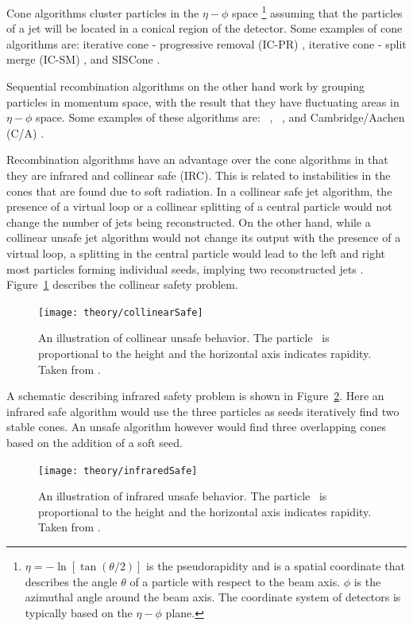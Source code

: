 Cone algorithms cluster particles in the $\eta-\phi$ space \footnote{$\eta = -\ln [\tan(\theta/2)]$ is the pseudorapidity and is a spatial coordinate that describes the angle $\theta$ of a particle with respect to the beam axis. $\phi$ is the azimuthal angle around the beam axis. The coordinate system of detectors is typically based on the $\eta-\phi$ plane.} assuming that the particles of a jet will be located in a conical region of the detector.
Some examples of cone algorithms are: iterative cone - progressive removal (IC-PR) \cite{ARNISON1983214}, iterative cone - split merge (IC-SM) \cite{Blazey:2000qt}, and SISCone \cite{Salam_2007}.

Sequential recombination algorithms on the other hand work by grouping particles in momentum space, with the result that they have fluctuating areas in $\eta-\phi$ space.
Some examples of these algorithms are: \kt\ \cite{Catani:1993hr}, \antikt\ \cite{Cacciari:2008gp}, and Cambridge/Aachen (C/A) \cite{Dokshitzer:1997in}.

Recombination algorithms have an advantage over the cone algorithms in that they are infrared and collinear safe (IRC).
This is related to instabilities in the cones that are found due to soft radiation.
In a collinear safe jet algorithm, the presence of a virtual loop or a collinear splitting of a central particle would not change the number of jets being reconstructed.
On the other hand, while a collinear unsafe jet algorithm would not change its output with the presence of a virtual loop, a splitting in the central particle would lead to the left and right most particles forming individual seeds, implying two reconstructed jets \cite{Salam:2009jx}.
Figure~\ref{fig:collinearSafe} describes the collinear safety problem.

\begin{figure}[htp]
\centering
\texttt{[image: theory/collinearSafe]}
\caption{An illustration of collinear unsafe behavior.
The particle \pt\ is proportional to the height and the horizontal axis indicates rapidity.
Taken from \cite{Salam:2009jx}.}
\label{fig:collinearSafe}
\end{figure}

A schematic describing infrared safety problem is shown in Figure~\ref{fig:infraredSafe}.
Here an infrared safe algorithm would use the three particles as seeds iteratively find two stable cones.
An unsafe algorithm however would find three overlapping cones based on the addition of a soft seed.

\begin{figure}[htp]
\centering
\texttt{[image: theory/infraredSafe]}
\caption{An illustration of infrared unsafe behavior.
The particle \pt\ is proportional to the height and the horizontal axis indicates rapidity.
Taken from \cite{Salam_2007}.}
\label{fig:infraredSafe}
\end{figure}

